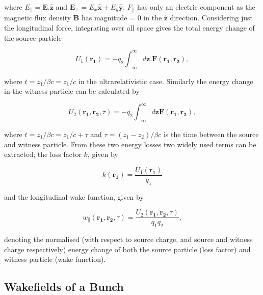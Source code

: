 where $E_{\parallel} = \mathbf{E}.\mathbf{\hat{z}}$ and $\mathbf{E_{\perp}} = E_{x}\mathbf{\hat{x}} + E_{y}\mathbf{\hat{y}}$. $F_{\parallel}$ has only an electric component as the magnetic flux density $\mathbf{B}$ has magnitude = 0 in the $\mathbf{\hat{z}}$ direction. Considering just the longitudinal force, integrating over all space gives the total energy change of the source particle

\begin{equation}
U_{1}\left(\mathbf{r_{1}}  \right) = -q_{2} \int^{\infty}_{-\infty} d\mathbf{z} . \mathbf{F}\left(\mathbf{r_{1}}, \mathbf{r_{2}}  \right),
\end{equation}

where $t = z_{1}/\beta{}c = z_{1}/c$ in the ultrarelativistic case. Similarly the energy change in the witness particle can be calculated by

\begin{equation}
U_{2}\left(\mathbf{r_{1}}, \mathbf{r_{2}}, \tau  \right)  = -q_{2} \int^{\infty}_{-\infty} d\mathbf{z} \mathbf{F}\left(\mathbf{r_{1}}, \mathbf{r_{2}}  \right),
\label{eqn:witness_energy_change_single}
\end{equation}

where $t = z_{1}/\beta{}c = z_{1}/c + \tau$ and $\tau = \left( z_{1}-z_{2} \right)/\beta{}c$ is the time between the source and witness particle. From these two energy losses two widely used terms can be extracted; the loss factor $k$, given by

\begin{equation}
k\left(\mathbf{r_{1}}  \right) = \frac{U_{1}\left(\mathbf{r_{1}}  \right)}{q_{1}}
\end{equation}

and the longitudinal wake function, given by

\begin{equation}
w_{\parallel}\left(\mathbf{r_{1}}, \mathbf{r_{2}}, \tau   \right) = \frac{U_{2}\left(\mathbf{r_{1}}, \mathbf{r_{2}}, \tau  \right) }{q_{1} q_{2}},
\label{eqn:long_wake_func}
\end{equation}

denoting the normalised (with respect to source charge, and source and witness charge respectively) energy change of both the source particle (loss factor) and witness particle (wake function). 

\subsection{Wakefields of a Bunch}

